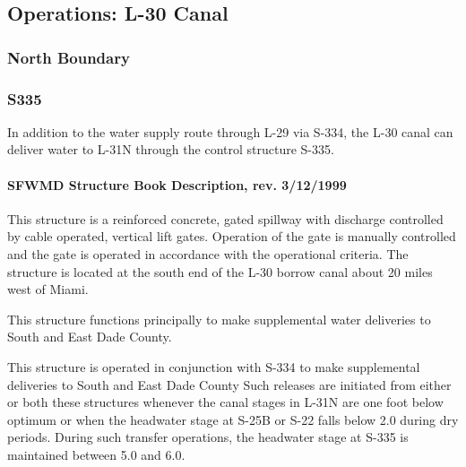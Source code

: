 \clearpage
\subsection{Operations: L-30 Canal}

\subsubsection{North Boundary}



\clearpage
\subsubsection{S335}
In addition to the water supply route through L-29 via S-334, the L-30 canal can deliver water to L-31N through the control structure S-335.

\paragraph{SFWMD Structure Book Description, rev. 3/12/1999}
This structure is a reinforced concrete, gated spillway with discharge controlled by cable operated, vertical lift gates.
Operation of the gate is manually controlled and the gate is operated in accordance with the operational criteria.
The structure is located at the south end of the L-30 borrow canal about 20 miles west of Miami.

This structure functions principally to make supplemental water deliveries to South and East Dade County.

This structure is operated in conjunction with S-334 to make supplemental deliveries to South and East Dade County
Such releases are initiated from either or both these structures whenever the canal stages in L-31N are one foot below optimum or when the headwater stage at S-25B or S-22 falls below 2.0 during dry periods.
During such transfer operations, the headwater stage at S-335 is maintained between 5.0 and 6.0.

